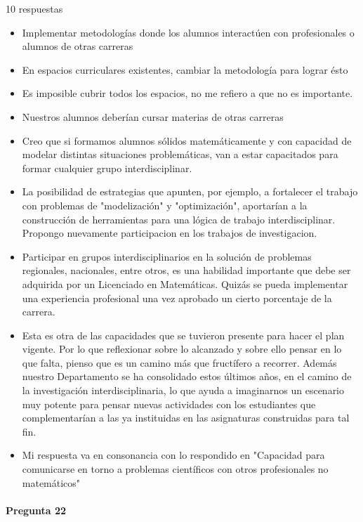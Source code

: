\documentclass[a4paper,10pt,BCOR10mm,oneside,headsepline]{scrbook}
\begin{document}
\begin{subappendices}
 10 respuestas

 \begin{itemize}
\item  Implementar metodologías donde los alumnos interactúen con profesionales o alumnos de otras carreras
\item En espacios curriculares existentes, cambiar la metodología para lograr ésto
\item Es imposible cubrir todos los espacios, no me refiero a que no es importante. 
\item Nuestros alumnos deberían cursar materias de otras carreras
\item Creo que si formamos alumnos sólidos matemáticamente y con capacidad de modelar distintas situaciones problemáticas, van a estar capacitados para formar cualquier grupo interdisciplinar.
\item La posibilidad de estrategias que apunten, por ejemplo, a fortalecer el trabajo con problemas de "modelización" y "optimización", aportarían a la construcción de herramientas para una lógica de trabajo interdisciplinar.
Propongo nuevamente participacion en los trabajos de investigacion.
\item Participar en grupos interdisciplinarios en la solución de problemas regionales, nacionales, entre otros, es una habilidad importante que debe ser adquirida por un Licenciado en Matemáticas. Quizás se pueda implementar una experiencia profesional una vez aprobado un cierto porcentaje de la carrera. 
\item Esta es otra de las capacidades que se tuvieron presente para hacer el plan vigente. Por lo que reflexionar sobre lo alcanzado y sobre ello pensar en lo que falta, pienso que es un camino más que fructífero a recorrer. Además nuestro Departamento se ha consolidado estos últimos años, en el camino de la investigación interdisciplinaria, lo que ayuda a imaginarnos un escenario muy potente para pensar nuevas actividades con los estudiantes  que complementarían a las ya instituidas en las asignaturas construidas  para tal fin. 
\item Mi respuesta va en consonancia con lo respondido en "Capacidad para comunicarse en torno a problemas científicos con otros profesionales no matemáticos"

\end{itemize}



     \paragraph{Pregunta 22}
\begin{center}
 

\end{center}
\end{subappendices}
\end{document}
